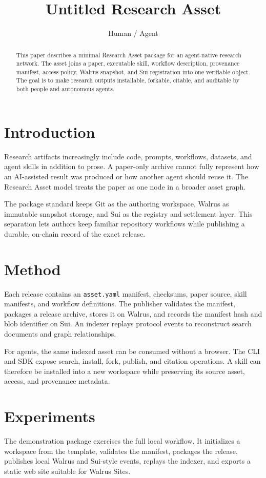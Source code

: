 \documentclass{article}
\title{Untitled Research Asset}
\author{Human / Agent}
\begin{document}
\maketitle
\begin{abstract}
This paper describes a minimal Research Asset package for an agent-native
research network. The asset joins a paper, executable skill, workflow
description, provenance manifest, access policy, Walrus snapshot, and Sui registration into one
verifiable object. The goal is to make research outputs installable,
forkable, citable, and auditable by both people and autonomous agents.
\end{abstract}
\section{Introduction}
Research artifacts increasingly include code, prompts, workflows, datasets, and
agent skills in addition to prose. A paper-only archive cannot fully represent
how an AI-assisted result was produced or how another agent should reuse it.
The Research Asset model treats the paper as one node in a broader asset graph.

The package standard keeps Git as the authoring workspace, Walrus as immutable
snapshot storage, and Sui as the registry and settlement layer. This separation
lets authors keep familiar repository workflows while publishing a durable,
on-chain record of the exact release.

\section{Method}
Each release contains an \texttt{asset.yaml} manifest, checksums, paper source,
skill manifests, and workflow definitions. The publisher validates the manifest,
packages a release archive, stores it on Walrus, and records the manifest hash
and blob identifier on Sui. An indexer replays protocol events to reconstruct
search documents and graph relationships.

For agents, the same indexed asset can be consumed without a browser. The CLI
and SDK expose search, install, fork, publish, and citation operations. A skill
can therefore be installed into a new workspace while preserving its source
asset, access, and provenance metadata.

\section{Experiments}
The demonstration package exercises the full local workflow. It initializes a
workspace from the template, validates the manifest, packages the release,
publishes local Walrus and Sui-style events, replays the indexer, and exports a
static web site suitable for Walrus Sites.
\end{document}
